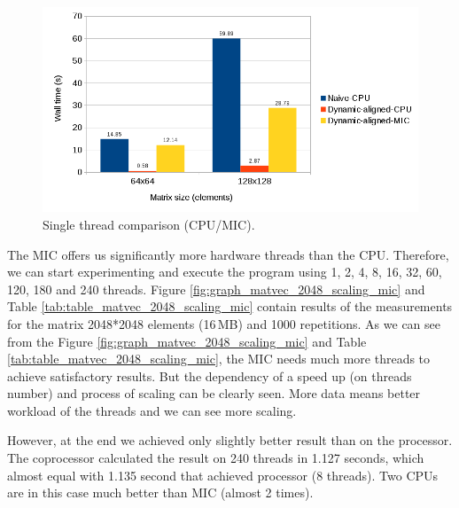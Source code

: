 \begin{figure}[htbp]
    \centering
    \includegraphics[width=1\linewidth]{fig/matvec_comparasion_1thread.png}
    \caption{Single thread comparison (CPU/MIC).}
    \label{fig:graph_matvec_comparasion_1thread}
\end{figure}

\par The MIC offers us significantly more hardware threads than the CPU. Therefore, we can start experimenting and execute the program using 1, 2, 4, 8, 16, 32, 60, 120, 180 and 240 threads. Figure \ref{fig:graph_matvec_2048_scaling_mic} and Table \ref{tab:table_matvec_2048_scaling_mic} contain results of the measurements for the matrix 2048*2048 elements (16\,MB) and 1000 repetitions. As we can see from the Figure \ref{fig:graph_matvec_2048_scaling_mic} and Table \ref{tab:table_matvec_2048_scaling_mic}, the MIC needs much more threads to achieve satisfactory results. But the dependency of a speed up (on threads number) and process of scaling can be clearly seen. More data means better workload of the threads and we can see more  scaling. 

\par However, at the end we achieved only slightly better result than on the processor. The coprocessor calculated the result on 240 threads in 1.127 seconds, which almost equal with 1.135 second that achieved processor (8 threads). Two CPUs are in this case much better than MIC (almost 2 times).

